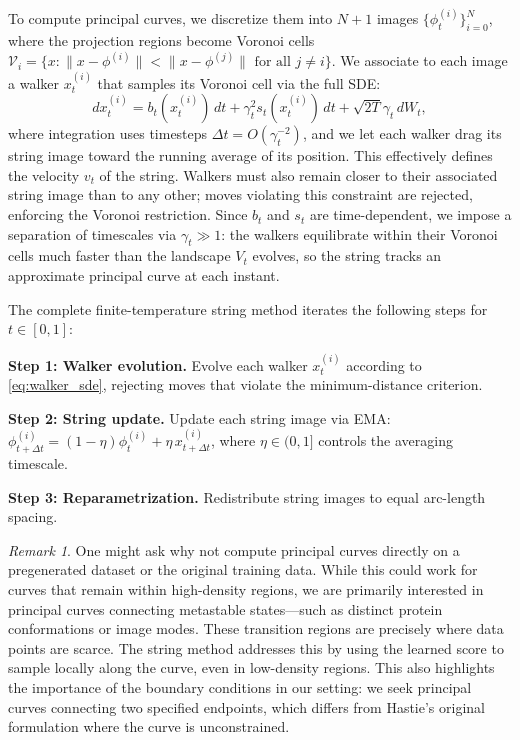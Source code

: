 \documentclass{article}
\theoremstyle{plain}
\theoremstyle{definition}
\theoremstyle{remark}
\newtheorem{remark}[theorem]{Remark}
\begin{document}
To compute principal curves, we discretize them into $N+1$ images $\{\phi_t^{(i)}\}_{i=0}^N$, where the projection regions become Voronoi cells $\mathcal{V}_i = \{x : \|x - \phi^{(i)}\| < \|x - \phi^{(j)}\| \text{ for all } j \neq i\}$. We associate to each image a walker $x_t^{(i)}$ that samples its Voronoi cell via the full SDE:
\begin{equation}
    dx_t^{(i)} = b_t(x_t^{(i)})\, dt + \gamma_t^2 s_t(x_t^{(i)})\, dt + \sqrt{2T}\gamma_t\, dW_t,
    \label{eq:walker_sde}
\end{equation}
where integration uses timesteps $\Delta t = O(\gamma_t^{-2})$, and we let each walker drag its string image toward the running average of its position. This effectively defines the velocity $v_t$ of the string. Walkers must also remain closer to their associated string image than to any other; moves violating this constraint are rejected, enforcing the Voronoi restriction. Since $b_t$ and $s_t$ are time-dependent, we impose a separation of timescales via $\gamma_t \gg 1$: the walkers equilibrate within their Voronoi cells much faster than the landscape $V_t$ evolves, so the string tracks an approximate principal curve at each instant.


The complete finite-temperature string method iterates the following steps for $t \in [0,1]$:

\textbf{Step 1: Walker evolution.} Evolve each walker $x_t^{(i)}$ according to \eqref{eq:walker_sde}, rejecting moves that violate the minimum-distance criterion.

\textbf{Step 2: String update.} Update each string image via EMA: $\phi_{t+\Delta t}^{(i)} = (1-\eta)\phi_t^{(i)} + \eta\, x_{t+\Delta t}^{(i)}$, where $\eta \in (0,1]$ controls the averaging timescale.

\textbf{Step 3: Reparametrization.} Redistribute string images to equal arc-length spacing.




\begin{remark}
One might ask why not compute principal curves directly on a pregenerated dataset or the original training data. While this could work for curves that remain within high-density regions, we are primarily interested in principal curves connecting metastable states---such as distinct protein conformations or image modes. These transition regions are precisely where data points are scarce. The string method addresses this by using the learned score to sample locally along the curve, even in low-density regions. This also highlights the importance of the boundary conditions in our setting: we seek principal curves connecting two specified endpoints, which differs from Hastie's original formulation where the curve is unconstrained.
\end{remark}
\end{document}
